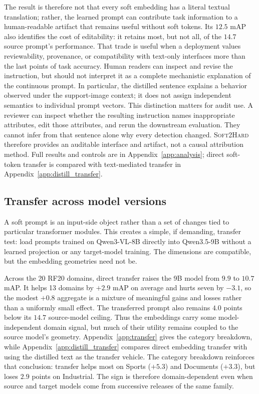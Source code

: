 \documentclass{article}
\newcommand{\distill}{\textsc{Soft2Hard}}
\newcommand{\qwen}{Qwen3-VL}
\begin{document}
The result is therefore not that every soft embedding has a literal textual
translation; rather, the learned prompt can contribute task information to a
human-readable artifact that remains useful without soft tokens.
Its $12.5$ mAP also identifies the cost of editability: it retains most, but
not all, of the $14.7$ source prompt's performance. That trade is useful when a
deployment values reviewability, provenance, or compatibility with text-only
interfaces more than the last points of task accuracy. Human readers can
inspect and revise the instruction, but should not interpret it as a complete
mechanistic explanation of the continuous prompt.
In particular, the distilled sentence explains a behavior observed under the
support-image context; it does not assign independent semantics to individual
prompt vectors. This distinction matters for audit use. A reviewer can inspect
whether the resulting instruction names inappropriate attributes, edit those
attributes, and rerun the downstream evaluation. They cannot infer from that
sentence alone why every detection changed. \distill{} therefore provides an
auditable interface and artifact, not a causal attribution method.
Full results and controls are in Appendix~\ref{app:analysis}; direct
soft-token transfer is compared with text-mediated transfer in
Appendix~\ref{app:distill_transfer}.

\subsection{Transfer across model versions}
\label{subsec:transfer_main}

A soft prompt is an input-side object rather than a set of changes tied to
particular transformer modules. This creates a simple, if demanding, transfer
test: load prompts trained on \qwen{}-8B directly into Qwen3.5-9B without a
learned projection or any target-model training. The dimensions are compatible,
but the embedding geometries need not be.

Across the 20 RF20 domains, direct transfer raises the 9B model from $9.9$ to
$10.7$ mAP. It helps 13 domains by $+2.9$ mAP on average and hurts seven by
$-3.1$, so the modest $+0.8$ aggregate is a mixture of meaningful gains and
losses rather than a uniformly small effect. The transferred prompt also
remains $4.0$ points below its $14.7$ source-model ceiling. Thus the embeddings
carry some model-independent domain signal, but much of their utility remains
coupled to the source model's geometry. Appendix~\ref{app:transfer} gives the
category breakdown, while Appendix~\ref{app:distill_transfer} compares direct
embedding transfer with using the distilled text as the transfer vehicle.
The category breakdown reinforces that conclusion: transfer helps most on
Sports ($+5.3$) and Documents ($+3.3$), but loses $2.9$ points on Industrial.
The sign is therefore domain-dependent even when source and target models come
from successive releases of the same family.
\end{document}
